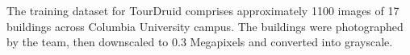 The training dataset for TourDruid comprises approximately 1100 images of 17 buildings across Columbia University campus. The buildings were photographed by the team, then downscaled to 0.3 Megapixels and converted into grayscale.